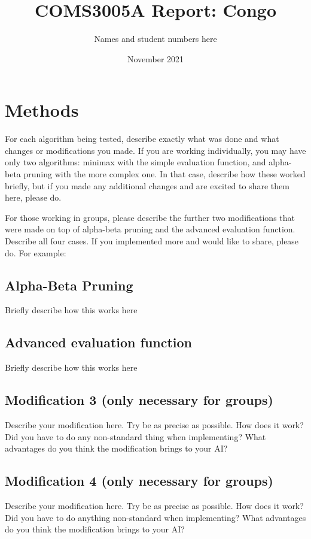 \documentclass[twocolumn]{article}
\title{COMS3005A Report: Congo}
\author{Names and student numbers here}
\date{November 2021}
\begin{document}
\maketitle

\section{Methods}

For each algorithm being tested, describe exactly what was done and what changes or modifications you made. If you are working individually, you may have only two algorithms: minimax with the simple evaluation function, and alpha-beta pruning with the more complex one. In that case, describe how these worked briefly, but if you made any additional changes and are excited to share them here, please do.

For those working in groups, please describe the further two modifications that were made on top of alpha-beta pruning and the advanced evaluation function. Describe all four cases. If you implemented more and would like to share, please do. 
For example:

\subsection{Alpha-Beta Pruning}

Briefly describe how this works here

\subsection{Advanced evaluation function}

Briefly describe how this works here

\subsection{Modification 3 (only necessary for groups)}

Describe your modification here. Try be as precise as possible. How does it work? Did you have to do any non-standard thing when implementing? What advantages do you think the modification brings to your AI?

\subsection{Modification 4 (only necessary for groups)}

Describe your modification here. Try be as precise as possible. How does it work? Did you have to do anything non-standard when implementing? What advantages do you think the modification brings to your AI?
\end{document}

